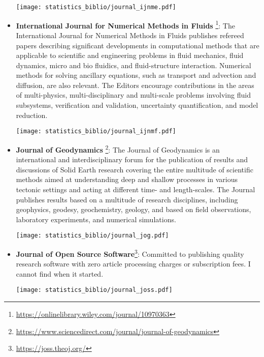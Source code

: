 \begin{itemize}
\begin{center}
\texttt{[image: statistics\_biblio/journal\_ijnme.pdf]}
\end{center}

\item {\bf International Journal for Numerical Methods in Fluids}
\footnote{\url{https://onlinelibrary.wiley.com/journal/10970363}}:
The International Journal for Numerical Methods in Fluids publishes refereed papers describing significant developments in computational methods that are applicable to scientific and engineering problems in fluid mechanics, fluid dynamics, micro and bio fluidics, and fluid-structure interaction. Numerical methods for solving ancillary equations, such as transport and advection and diffusion, are also relevant. The Editors encourage contributions in the areas of multi-physics, multi-disciplinary and multi-scale problems involving fluid subsystems, verification and validation, uncertainty quantification, and model reduction.
\begin{center}
\texttt{[image: statistics\_biblio/journal\_ijnmf.pdf]}
\end{center}

\item {\bf Journal of Geodynamics}
\footnote{\url{https://www.sciencedirect.com/journal/journal-of-geodynamics}}:
The Journal of Geodynamics is an international and interdisciplinary forum for the publication of results and discussions of Solid Earth research covering the entire multitude of scientific methods aimed at understanding deep and shallow processes in various tectonic settings and acting at different time- and length-scales. The Journal publishes results based on a multitude of research disciplines, including geophysics, geodesy, geochemistry, geology, and based on field observations, laboratory experiments, and numerical simulations.

\begin{center}
\texttt{[image: statistics\_biblio/journal\_jog.pdf]}
\end{center}

\item {\bf Journal of Open Source Software}\footnote{\url{https://joss.theoj.org/}}:
Committed to publishing quality research software with zero article processing charges or subscription fees.
I cannot find when it started.
\begin{center}
\texttt{[image: statistics\_biblio/journal\_joss.pdf]}
\end{center}


\end{itemize}

